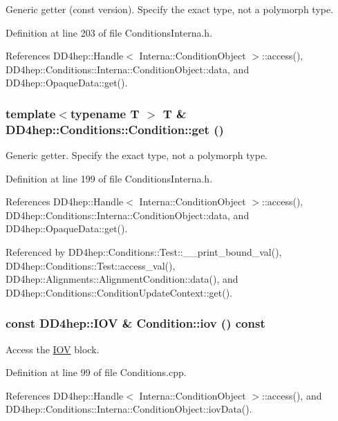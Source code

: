Generic getter (const version). Specify the exact type, not a polymorph type. 

Definition at line 203 of file ConditionsInterna.h.

References DD4hep::Handle$<$ Interna::ConditionObject $>$::access(), DD4hep::Conditions::Interna::ConditionObject::data, and DD4hep::OpaqueData::get().\hypertarget{class_d_d4hep_1_1_conditions_1_1_condition_af21f0921b4cd325d6cc6616747a278c9}{
\subsubsection[{get}]{\setlength{\rightskip}{0pt plus 5cm}template$<$typename T $>$ {\bf T} \& DD4hep::Conditions::Condition::get ()}}
\label{class_d_d4hep_1_1_conditions_1_1_condition_af21f0921b4cd325d6cc6616747a278c9}


Generic getter. Specify the exact type, not a polymorph type. 

Definition at line 199 of file ConditionsInterna.h.

References DD4hep::Handle$<$ Interna::ConditionObject $>$::access(), DD4hep::Conditions::Interna::ConditionObject::data, and DD4hep::OpaqueData::get().

Referenced by DD4hep::Conditions::Test::\_\-\_\-print\_\-bound\_\-val(), DD4hep::Conditions::Test::access\_\-val(), DD4hep::Alignments::AlignmentCondition::data(), and DD4hep::Conditions::ConditionUpdateContext::get().\hypertarget{class_d_d4hep_1_1_conditions_1_1_condition_ab22cbdbeece6355070483572b6a117fb}{
\subsubsection[{iov}]{\setlength{\rightskip}{0pt plus 5cm}const {\bf DD4hep::IOV} \& Condition::iov () const}}
\label{class_d_d4hep_1_1_conditions_1_1_condition_ab22cbdbeece6355070483572b6a117fb}


Access the \hyperlink{class_d_d4hep_1_1_i_o_v}{IOV} block. 

Definition at line 99 of file Conditions.cpp.

References DD4hep::Handle$<$ Interna::ConditionObject $>$::access(), and DD4hep::Conditions::Interna::ConditionObject::iovData().

